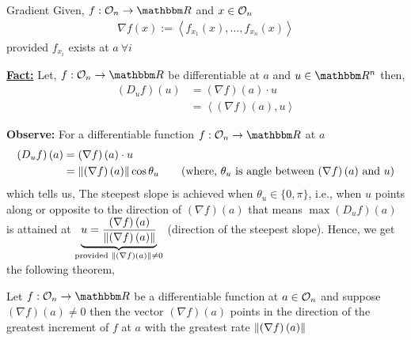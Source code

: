 \documentclass[../Analysis-3]{subfiles}
\begin{document}
\begin{Def}{Gradient}{}
  Given, $ f:\Op{n}\to\R $ and $ x\in\mathcal{O}_{n} $
  \begin{align*}
    \nabla f(x) := \left\langle f_{x_1}(x), \ldots, f_{x_n}(x) \right\rangle
  \end{align*}
  provided $ f_{x_i} $ exists at $ a \ \forall i $
\end{Def}

\textbf{\underline{Fact:}} Let, $ f:\Op{n}\to\R $ be differentiable at $ a $ and $ u\in\R^n $ then,
\begin{align*}
  \left( D_uf \right)(u) & = \left( \nabla f\right)\left( a \right)\cdot u \\ &= \left\langle \left( \nabla f \right)\left( a \right), u \right\rangle
\end{align*}

\textbf{Observe:} For a differentiable function $ f: \Op{n} \to \R $ at $ a $
\begin{align*}
  \left( D_uf \right)\left( a \right) & = \left( \nabla f\right)\left( a \right)\cdot u                                                                                                         \\
                                      & = \norm{\left( \nabla f\right)\left( a \right)}\cos{\theta_u} \tag{where, $\theta_u$ is angle between $\left( \nabla f\right)\left( a \right)$ and $u$}
\end{align*}
which tells us, The steepest slope is achieved when $ \theta_u \in \{0, \pi\} $, i.e., when $ u $ points along or opposite to the direction of $ \left( \nabla f\right)\left( a \right) $
that means $ \max \left( D_uf \right)\left( a \right) $ is attained at $ \underbrace{u = \frac{\left( \nabla f\right)\left( a \right)}{\norm{\left( \nabla f\right)\left( a \right)}}}_{\text{provided } \norm{\left( \nabla f\right)\left( a \right)} \not=0 } $ (direction of the steepest slope).
Hence, we get the following theorem,
\begin{Thm}{}{}
  Let $ f: \Op{n} \to \R $ be a differentiable function at $ a \in \mathcal{O}_{n} $ and suppose $ \left( \nabla f\right)\left( a \right) \not= 0 $ then the vector $\left( \nabla f\right)\left( a \right)$ points in the direction of the greatest increment of $ f $ at $ a $ with the greatest rate $ \norm{\left( \nabla f\right)\left( a \right)} $
\end{Thm}
\end{document}

